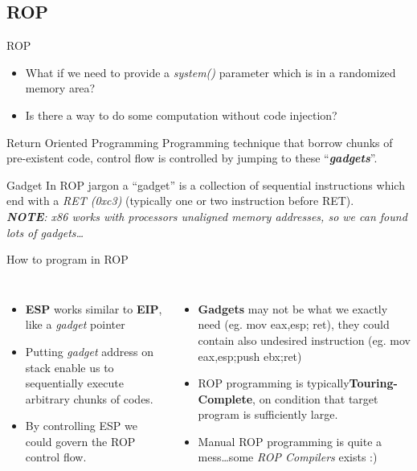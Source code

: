 \subsection{ROP}
\begin{frame}{ROP}

\begin{itemize}
\item What if we need to provide a \emph{system()} parameter  which is in a randomized memory area?
\item Is there a way to do some computation without code injection?
\end{itemize}

\begin{block}{Return Oriented Programming}
Programming technique that borrow chunks of pre-existent code, control flow is controlled by jumping to these ``{\bf \emph{gadgets}}''.
\end{block}

\begin{block}{Gadget}
In ROP jargon a ``gadget'' is a collection of sequential instructions which end with a \emph{RET (0xc3)} (typically one or two instruction before RET).\\
\emph{{\bf NOTE}: x86 works with processors unaligned memory addresses, so we can found lots of gadgets\ldots}
\end{block}

\framebreak 

\begin{block}{How to program in ROP}
\begin{columns}[c] 
    \begin{itemize}
    \item {\bf ESP} works similar to {\bf EIP}, like a \emph{gadget} pointer
   	\item Putting \emph{gadget} address on stack enable us to sequentially execute arbitrary chunks of codes.
   	\item By controlling ESP we could govern the ROP control flow.
	\end{itemize}     
    \begin{itemize}
    \item {\bf Gadgets} may not be what we exactly need (eg. mov eax,esp; ret), they could contain also undesired instruction (eg. mov eax,esp;push ebx;ret)
    \item ROP programming is typically{\bf Touring-Complete}, on condition that target program is sufficiently large.
    \item Manual ROP programming is quite a mess\ldots some \emph{ROP Compilers} exists :)
	\end{itemize}
\end{columns}
\end{block}


\end{frame}

